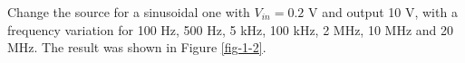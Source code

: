 \documentclass{article}
\begin{document}
Change the source for a sinusoidal one with $V_{in}=0.2$ V and output 10 V, with a frequency variation for 100 Hz, 500 Hz, 5 kHz, 100 kHz, 2 MHz, 10 MHz and 20 MHz. The result was shown in Figure \ref{fig-1-2}.

\begin{figure}[htbp]
	\centering
\end{figure}
\end{document}
